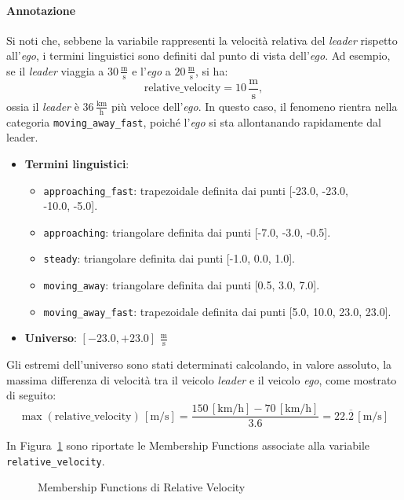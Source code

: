 \paragraph{Annotazione} Si noti che, sebbene la variabile rappresenti la velocità relativa del \emph{leader} rispetto all'\emph{ego}, 
i termini linguistici sono definiti dal punto di vista dell'\emph{ego}. Ad esempio, se il \emph{leader} viaggia a $30\,\frac{\mathrm{m}}{\mathrm{s}}$ e 
l'\emph{ego} a $20\,\frac{\mathrm{m}}{\mathrm{s}}$, si ha:
\[
\text{relative\_velocity} = 10\,\frac{\mathrm{m}}{\mathrm{s}},
\]
ossia il \emph{leader} è $36\,\frac{\mathrm{km}}{\mathrm{h}}$ più veloce dell'\emph{ego}. In questo caso, il fenomeno rientra nella categoria 
\texttt{moving\_away\_fast}, poiché l'\emph{ego} si sta allontanando rapidamente dal leader.
\begin{itemize}
  \item \textbf{Termini linguistici}:
    \begin{itemize}
      \item \texttt{approaching\_fast}: trapezoidale definita dai punti [-23.0, -23.0, \\ -10.0, -5.0].
      \item \texttt{approaching}: triangolare definita dai punti [-7.0, -3.0, -0.5].
      \item \texttt{steady}: triangolare definita dai punti [-1.0, 0.0, 1.0].
      \item \texttt{moving\_away}: triangolare definita dai punti [0.5, 3.0, 7.0].
      \item \texttt{moving\_away\_fast}: trapezoidale definita dai punti [5.0, 10.0, 23.0, 23.0].
    \end{itemize}
  \item \textbf{Universo}: \([-23.0,+23.0]\) $\frac{\mathrm{m}}{\mathrm{s}}$
\end{itemize}
Gli estremi dell'universo sono stati determinati calcolando, in valore assoluto, la massima differenza di velocità tra il veicolo
\emph{leader} e il veicolo \emph{ego}, come mostrato di seguito:
\[
  \max(\text{relative\_velocity}) \,[\mathrm{m}/\mathrm{s}]
  = \frac{150\,[\mathrm{km}/\mathrm{h}] - 70\,[\mathrm{km}/\mathrm{h}]}{3.6}
  = 22.\overline{2}\,[\mathrm{m}/\mathrm{s}]
\]

\noindent In Figura~\ref{Fig:mf_relative_velocity} sono riportate le Membership Functions associate alla variabile \texttt{relative\_velocity}.
\begin{figure}[H]
    \centering
    \caption{Membership Functions di Relative Velocity}
    \label{Fig:mf_relative_velocity}
\end{figure}

